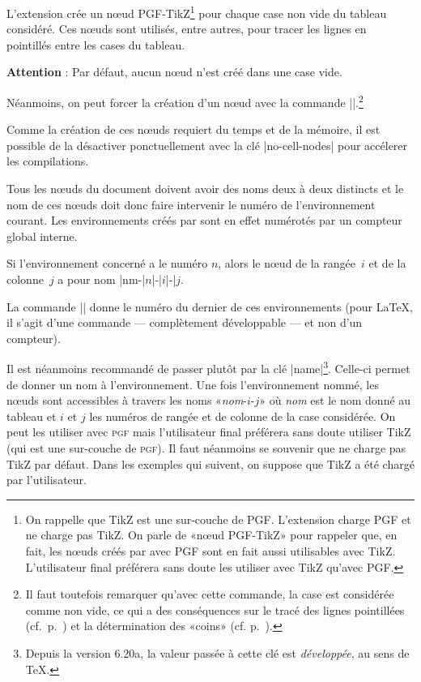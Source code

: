\documentclass[dvipsnames]{article}%
\begin{document}

L'extension  crée un nœud PGF-TikZ\footnote{On rappelle que TikZ
  est une sur-couche de PGF. L'extension  charge PGF et ne
  charge pas TikZ. On parle de «nœud PGF-TikZ» pour rappeler que, en fait, les
  nœuds créés par  avec PGF sont en fait aussi utilisables avec
  TikZ. L'utilisateur final préférera sans doute les utiliser avec TikZ qu'avec
  PGF.} pour chaque case non vide du tableau considéré. Ces nœuds sont utilisés,
entre autres, pour tracer les lignes en pointillés entre les cases du tableau.

\smallskip
\textbf{Attention} : Par défaut, aucun nœud n'est créé dans une case vide.

\smallskip
Néanmoins, on peut forcer la création d'un nœud avec la commande |\NotEmpty|.\footnote{Il faut toutefois remarquer qu'avec cette commande, la
  case est considérée comme non vide, ce qui a des conséquences sur le tracé des
lignes pointillées (cf.~p.~\pageref{Cdots}) et la détermination des «coins»
(cf. p.~\pageref{corners}).}

\medskip
Comme la création de ces nœuds requiert du temps et de la mémoire, il est
possible de la désactiver ponctuellement avec la clé |no-cell-nodes| pour
accélerer les compilations. 

\medskip
Tous les nœuds du document doivent avoir des noms deux à deux distincts et le
nom de ces nœuds doit donc faire intervenir le numéro de l'environnement
courant. Les environnements créés par  sont en effet numérotés
par un compteur global interne.

\smallskip
Si l'environnement concerné a le numéro $n$, alors le nœud de la rangée~$i$ et
de la colonne~$j$ a pour nom |nm-|$n$|-|$i$|-|$j$.

\smallskip
{}
La commande |\NiceMatrixLastEnv| donne le numéro du dernier de ces
environnements (pour LaTeX, il s'agit d'une commande — complètement développable
— et non d'un compteur).

\smallskip
{}
Il est néanmoins recommandé de passer plutôt par la clé |name|\footnote{Depuis
  la version 6.20a, la valeur passée à cette clé est \emph{développée}, au sens
  de TeX.}. Celle-ci permet de donner un nom à l'environnement. Une fois
l'environnement nommé, les nœuds sont accessibles à travers les noms
«\textsl{nom}-$i$-$j$» où \textsl{nom} est le nom donné au tableau et $i$ et $j$
les numéros de rangée et de colonne de la case considérée. On peut les utiliser
avec \textsc{pgf} mais l'utilisateur final préférera sans doute utiliser TikZ
(qui est une sur-couche de \textsc{pgf}). Il faut néanmoins se souvenir que
 ne charge pas TikZ par défaut. Dans les exemples qui suivent,
on suppose que TikZ a été chargé par l'utilisateur.
\end{document}
